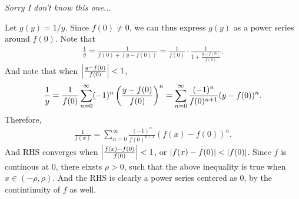 \documentclass[12pt]{article}
\begin{document}
\begin{fproof}[2(a)]
 \textit{Sorry I don't know this one...}
\end{fproof}

\begin{fproof}[2(b)]
 Let \(g(y) = 1/y\).
 Since \(f(0) \neq 0\), we can thus express \(g(y)\) as a power series around \(f(0)\).
 Note that
 \begin{align*}
   \frac{1}{y} = \frac{1}{f(0) + (y - f(0))} = \frac{1}{f(0)} \cdot \frac{1}{1 + \frac{y-f(0)}{f(0)}}.
 \end{align*}
 And note that when \(\left\lvert \frac{y-f(0)}{f(0)} \right\rvert < 1\),
 \begin{align*}
   \frac{1}{y} = \frac{1}{f(0)} \sum_{n=0}^{\infty} (-1)^n \left( \frac{y - f(0)}{f(0)} \right)^n = \sum_{n=0}^{\infty} \frac{(-1)^n}{f(0)^{n+1}} (y - f(0))^n.
 \end{align*}
 Therefore,
 \begin{align*}
   \frac{1}{f(x)} = \sum_{n=0}^{\infty} \frac{(-1)^n}{f(0)^{n+1}} (f(x) - f(0))^n.
 \end{align*}
 And RHS converges when \(\left\lvert \frac{f(x)-f(0)}{f(0)} \right\rvert < 1\), or \(\left\lvert f(x)-f(0) \right\rvert < \left\lvert f(0) \right\rvert\). Since \(f\) is continous at 0, there eixsts \(\rho > 0\), such that the above inequality is true when \(x \in (-\rho, \rho)\).
 And the RHS is clearly a power series centered as \(0\), by the contintinuity of \(f\) as well.

\end{fproof}
\newpage
\end{document}
